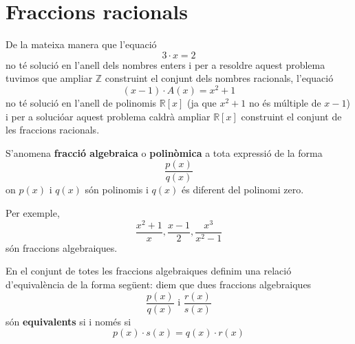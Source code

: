 \section{Fraccions racionals}

De la mateixa manera que l'equació
\begin{equation*}
3\cdot x=2
\end{equation*}no té solució en l'anell dels nombres enters i per a
resoldre aquest problema tuvimos que ampliar $\mathbb{Z}$ construint el
conjunt dels nombres racionals, l'equació\begin{equation*}
(x-1)\cdot A(x)=x^{2}+1
\end{equation*}no té solució en l'anell de polinomis $\mathbb{R}[x]$ (ja que $x^{2}+1$ no és múltiple de $x-1$) i per a solucióar aquest problema
caldrà ampliar $\mathbb{R}[x]$ construint el conjunt de les fraccions
racionals.

S'anomena \textbf{fracció algebraica} o \textbf{polinòmica} a tota
expressió de la forma\begin{equation*}
\frac{p(x)}{q(x)}
\end{equation*}on $p(x)$ i $q(x)$ són polinomis i $q(x)$ és diferent del polinomi zero.

Per exemple,\begin{equation*}
\frac{x^{2}+1}{x},\frac{x-1}{2},\frac{x^{3}}{x^{2}-1}
\end{equation*}són fraccions algebraiques.

En el conjunt de totes les fraccions algebraiques definim una relació d'equivalència de la forma següent: diem que dues fraccions
algebraiques\begin{equation*}
\frac{p(x)}{q(x)}\text{ \ \ \ i \ \ \ }\frac{r(x)}{s(x)}
\end{equation*}són \textbf{equivalents} si i només si\begin{equation*}
p(x)\cdot s(x)=q(x)\cdot r(x)
\end{equation*}

